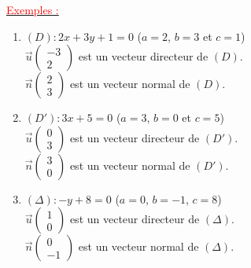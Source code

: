 \documentclass[12pt,a4paper]{article}
\begin{document}
\begin{center}
\end{center}

\noindent \underline{\textcolor{red}{Exemples :}}

\begin{enumerate}
    \item $(D) : 2x + 3y + 1 = 0$ ($a = 2$, $b = 3$ et $c = 1$) \\
    $\vec{u} \begin{pmatrix} -3 \\ 2 \end{pmatrix}$ est un vecteur directeur de $(D)$. \\
    $\vec{n} \begin{pmatrix} 2 \\ 3 \end{pmatrix}$ est un vecteur normal de $(D)$.
    
    \item $(D') : 3x + 5 = 0$ ($a = 3$, $b = 0$ et $c = 5$) \\
    $\vec{u} \begin{pmatrix} 0 \\ 3 \end{pmatrix}$ est un vecteur directeur de $(D')$. \\
    $\vec{n} \begin{pmatrix} 3 \\ 0 \end{pmatrix}$ est un vecteur normal de $(D')$.
    
    \item $(\Delta) : -y + 8 = 0$ ($a = 0$, $b = -1$, $c = 8$) \\
    $\vec{u} \begin{pmatrix} 1 \\ 0 \end{pmatrix}$ est un vecteur directeur de $(\Delta)$. \\
    $\vec{n} \begin{pmatrix} 0 \\ -1 \end{pmatrix}$ est un vecteur normal de $(\Delta)$.
\end{enumerate}
\end{document}
